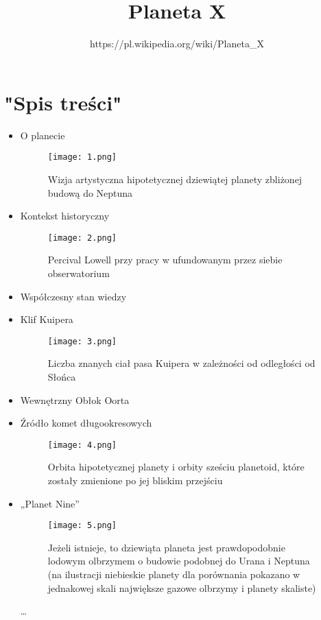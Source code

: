 \documentclass[12pt]{article}
\author{https://pl.wikipedia.org/wiki/Planeta{\_}X}
\title{\textsf{Planeta X}}
\begin{document}
\maketitle
\section{"Spis treści"}
\begin{itemize}
  \item O planecie \\
\begin{figure}[!ht]
\texttt{[image: 1.png]}\caption{Wizja artystyczna hipotetycznej dziewiątej planety zbliżonej budową do Neptuna}\label{fig:1}
\end{figure}
  \item Kontekst historyczny \\
\begin{figure}[!ht]
\texttt{[image: 2.png]}\caption{Percival Lowell przy pracy w ufundowanym przez siebie obserwatorium}\label{fig:2}
\end{figure}
  \item Współczesny stan wiedzy \\
  \item Klif Kuipera  \\
\begin{figure}[!ht]
\texttt{[image: 3.png]}\caption{Liczba znanych ciał pasa Kuipera w zależności od odległości od Słońca}\label{fig:3}
\end{figure}
  \item Wewnętrzny Obłok Oorta \\
  \item Źródło komet długookresowych  \\
\begin{figure}[!ht]
\texttt{[image: 4.png]}\caption{Orbita hipotetycznej planety i orbity sześciu planetoid, które zostały zmienione po jej bliskim przejściu}\label{fig:4}
\end{figure}
  \item „Planet Nine” \\
\begin{figure}[!ht]
\texttt{[image: 5.png]}\caption{Jeżeli istnieje, to dziewiąta planeta jest prawdopodobnie lodowym olbrzymem o budowie podobnej do Urana i Neptuna (na ilustracji niebieskie planety dla porównania pokazano w jednakowej skali największe gazowe olbrzymy i planety skaliste)}\label{fig:5}
\end{figure}
\ldots
\end{itemize}
\newpage
\end{document}
